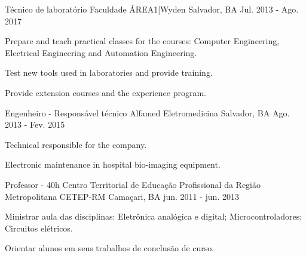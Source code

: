 \begin{cventries}
  \cventry
    {Técnico de laboratório} %
    {Faculdade ÁREA1|Wyden} %
    {Salvador, BA} %
    {Jul. 2013 - Ago. 2017} %
    {
      \begin{cvitems} %
        \item {Prepare and teach practical classes for the courses: Computer Engineering, Electrical Engineering and Automation Engineering.}
        \item {Test new tools used in laboratories and provide training.}
        \item {Provide extension courses and the experience program.}
      \end{cvitems}
    }

  \cventry
    {Engenheiro - Responsável técnico} %
    {Alfamed Eletromedicina} %
    {Salvador, BA} %
    {Ago. 2013 - Fev. 2015} %
    {
      \begin{cvitems} %
        \item {Technical responsible for the company.}
        \item {Electronic maintenance in hospital bio-imaging equipment.}
      \end{cvitems}
    }
    

  \cventry
    {Professor - 40h} %
    {Centro Territorial de Educação Profissional da Região Metropolitana CETEP-RM} %
    {Camaçari, BA} %
    {jun. 2011 - jun. 2013} %
    {
      \begin{cvitems} %
        \item {Ministrar aula das disciplinas: Eletrônica analógica e digital; Microcontroladores; Circuitos elétricos.}
        \item {Orientar alunos em seus trabalhos de conclusão de curso.}
      \end{cvitems}
    }
    

\end{cventries}
